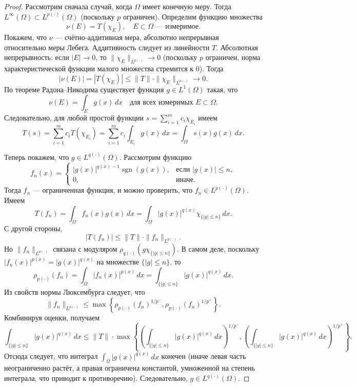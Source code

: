 \documentclass[../NDCNNAI_main.tex]{subfiles}
\begin{document}
\begin{proof}
Рассмотрим сначала случай, когда \( \Omega \) имеет конечную меру. Тогда \( L^\infty(\Omega) \subset L^{p(\cdot)}(\Omega) \) (поскольку \( p \) ограничен). Определим функцию множества
\[
\nu(E) = T(\chi_E), \quad E \subset \Omega \text{ --- измеримое}.
\]
Покажем, что \( \nu \) --- счётно-аддитивная мера, абсолютно непрерывная относительно меры Лебега. Аддитивность следует из линейности \( T \). Абсолютная непрерывность: если \( |E| \to 0 \), то \( \|\chi_E\|_{L^{p(\cdot)}} \to 0 \) (поскольку \( p \) ограничен, норма характеристической функции малого множества стремится к 0). Тогда
\[
|\nu(E)| = |T(\chi_E)| \leq \|T\| \cdot \|\chi_E\|_{L^{p(\cdot)}} \to 0.
\]
По теореме Радона–Никодима существует функция \( g \in L^1(\Omega) \) такая, что
\[
\nu(E) = \int_E g(x) \, dx \quad \text{для всех измеримых } E \subset \Omega.
\]
Следовательно, для любой простой функции \( s = \sum_{i=1}^m c_i \chi_{E_i} \) имеем
\[
T(s) = \sum_{i=1}^m c_i T(\chi_{E_i}) = \sum_{i=1}^m c_i \int_{E_i} g(x) \, dx = \int_{\Omega} s(x)g(x) \, dx.
\]

Теперь покажем, что \( g \in L^{q(\cdot)}(\Omega) \). Рассмотрим функцию
\[
f_n(x) = 
\begin{cases}
|g(x)|^{q(x)-1} \operatorname{sgn}(g(x)), & \text{если } |g(x)| \leq n, \\
0, & \text{иначе}.
\end{cases}
\]
Тогда \( f_n \) --- ограниченная функция, и можно проверить, что \( f_n \in L^{p(\cdot)}(\Omega) \). Имеем
\[
T(f_n) = \int_{\Omega} f_n(x)g(x) \, dx = \int_{\Omega} |g(x)|^{q(x)} \chi_{\{|g|\leq n\}} \, dx.
\]
С другой стороны,
\[
|T(f_n)| \leq \|T\| \cdot \|f_n\|_{L^{p(\cdot)}}.
\]
Но \( \|f_n\|_{L^{p(\cdot)}} \) связана с модуляром \( \rho_{q(\cdot)}(g \chi_{\{|g|\leq n\}}) \). В самом деле, поскольку \( |f_n(x)|^{p(x)} = |g(x)|^{q(x)} \) на множестве \( \{|g|\leq n\} \), то
\[
\rho_{p(\cdot)}(f_n) = \int_{\Omega} |f_n(x)|^{p(x)} \, dx = \int_{\{|g|\leq n\}} |g(x)|^{q(x)} \, dx.
\]
Из свойств нормы Люксембурга следует, что
\[
\|f_n\|_{L^{p(\cdot)}} \leq \max\left\{ \rho_{p(\cdot)}(f_n)^{1/p^-}, \rho_{p(\cdot)}(f_n)^{1/p^+} \right\}.
\]
Комбинируя оценки, получаем
\[
\int_{\{|g|\leq n\}} |g(x)|^{q(x)} \, dx \leq \|T\| \cdot \max\left\{ \left( \int_{\{|g|\leq n\}} |g(x)|^{q(x)} \, dx \right)^{1/p^-}, \left( \int_{\{|g|\leq n\}} |g(x)|^{q(x)} \, dx \right)^{1/p^+} \right\}.
\]
Отсюда следует, что интеграл \( \int_{\Omega} |g(x)|^{q(x)} \, dx \) конечен (иначе левая часть неограниченно растёт, а правая ограничена константой, умноженной на степень интеграла, что приводит к противоречию). Следовательно, \( g \in L^{q(\cdot)}(\Omega) \).


\end{proof}
\end{document}
